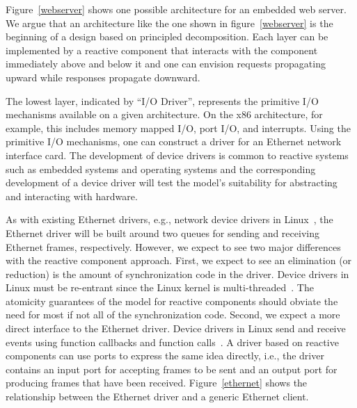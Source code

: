 Figure~\ref{webserver} shows one possible architecture for an embedded web server.
We argue that an architecture like the one shown in figure~\ref{webserver} is the beginning of a design based on principled decomposition.
Each layer can be implemented by a reactive component that interacts with the component immediately above and below it and one can envision requests propagating upward while responses propagate downward.

The lowest layer, indicated by ``I/O Driver'', represents the primitive I/O mechanisms available on a given architecture.
On the x86 architecture, for example, this includes memory mapped I/O, port I/O, and interrupts.
Using the primitive I/O mechanisms, one can construct a driver for an Ethernet network interface card.
The development of device drivers is common to reactive systems such as embedded systems and operating systems and the corresponding development of a device driver will test the model's suitability for abstracting and interacting with hardware.


As with existing Ethernet drivers, e.g., network device drivers in Linux~\cite{corbet2005linux}, the Ethernet driver will be built around two queues for sending and receiving Ethernet frames, respectively.
However, we expect to see two major differences with the reactive component approach.
First, we expect to see an elimination (or reduction) is the amount of synchronization code in the driver.
Device drivers in Linux must be re-entrant since the Linux kernel is multi-threaded~\cite{corbet2005linux}.
The atomicity guarantees of the model for reactive components should obviate the need for most if not all of the synchronization code.
Second, we expect a more direct interface to the Ethernet driver.
Device drivers in Linux send and receive events using function callbacks and function calls~\cite{corbet2005linux}.
A driver based on reactive components can use ports to express the same idea directly, i.e., the driver contains an input port for accepting frames to be sent and an output port for producing frames that have been received.
Figure~\ref{ethernet} shows the relationship between the Ethernet driver and a generic Ethernet client.

